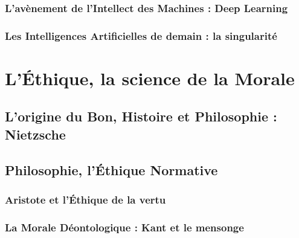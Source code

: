 \documentclass[10pt, french, a4paper]{report}
\begin{document}
\paragraph{}

\subsubsection{L'avènement de l'Intellect des Machines : Deep Learning}

\paragraph{}

\subsubsection{Les Intelligences Artificielles de demain : la singularité}

\paragraph{}


\section{L'\uppercase{é}thique, la science de la Morale}

\subsection{L'origine du Bon, Histoire et Philosophie : Nietzsche}

\subsection{Philosophie, l'\uppercase{é}thique Normative}


\subsubsection{Aristote et l'\uppercase{é}thique de la vertu}


\subsubsection{La Morale Déontologique : Kant et le mensonge}
\end{document}
